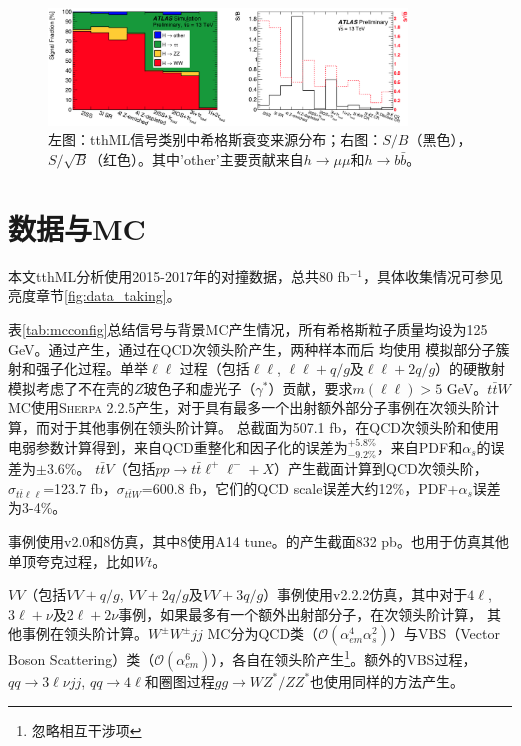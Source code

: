 \begin{figure}[h]
\centering
 \includegraphics[width=0.85\textwidth]{fig/tthML_signal_comp.png}
 \caption{左图：tthML信号类别中希格斯衰变来源分布；右图：$S/B$（黑色），$S/\sqrt{B}$（红色）。其中'other'主要贡献来自$h\rightarrow \mu\mu$和$h\rightarrow b\bar{b}$。\cite{Aaboud:2017jvq}}
 \label{fig:tthML_signal_comp}
\end{figure}

\section{数据与MC}
本文tthML分析使用2015-2017年的对撞数据，总共80 fb$^{-1}$，具体收集情况可参见亮度章节\ref{fig:data_taking}。

表\ref{tab:mcconfig}总结信号与背景MC产生情况，所有希格斯粒子质量均设为125 GeV。\tth 通过\POWHEGBOX 产生，\ttz 通过\MGMCatNLO 在QCD次领头阶产生，两种样本而后
均使用 模拟部分子簇射和强子化过程。单举\ttbar$\ell\ell$ 过程（包括\ttbar$\ell\ell$, \ttbar$\ell\ell+q/g$及\ttbar$\ell\ell+2q/g$）的硬散射模拟考虑了不在壳的$Z$玻色子和虚光子（$\gamma^*$）贡献，要求$m(\ell\ell)>5$ GeV。$t\bar{t}W$ MC使用\textsc{Sherpa 2.2.5}产生，对于具有最多一个出射额外部分子事例在次领头阶计算，而对于其他事例在领头阶计算。
\tth 总截面为507.1 fb，在QCD次领头阶和使用电弱参数\cite{Beenakker:2001rj,Beenakker:2002nc,Dawson:2002tg,Dawson:2003zu,Yu:2014cka,Frixione:2014qaa,Frixione:2015zaa}计算得到\cite{Heinemeyer:2013tqa,XSWG13TeV}，来自QCD重整化和因子化的误差为$^{+5.8\%}_{-9.2\%}$，来自PDF和$\alpha_s$的误差为$\pm3.6$\%。
$t\bar{t}V$（包括$pp\rightarrow t\bar{t}\ell^+\ell^-+X$）产生截面计算到QCD次领头阶\cite{Alwall:2014hca,Frixione:2015zaa}，$\sigma_{t\bar{t}\ell\ell}$=123.7 fb，$\sigma_{t\bar{t}W}$=600.8 fb，它们的QCD scale误差大约12\%，PDF+$\alpha_s$误差为3-4\%。

\ttbar 事例使用\POWHEG v2.0和\PYTHIA 8仿真，其中\PYTHIA 8使用A14 tune。\ttbar 的产生截面832 pb。\POWHEG 也用于仿真其他单顶夸克过程，比如$Wt$。

$VV$（包括$VV+q/g$, $VV+2q/g$及$VV+3q/g$）事例使用\SHERPA v2.2.2仿真，其中对于$4\ell$, $3\ell+\nu$及$2\ell+2\nu$事例，如果最多有一个额外出射部分子，在次领头阶计算，
其他事例在领头阶计算。$W^{\pm}W^{\pm}jj$ MC分为QCD类（$\mathcal{O}(\alpha_{em}^4\alpha_s^2)$）与VBS（Vector Boson Scattering）类（$\mathcal{O}(\alpha_{em}^6)$），各自在领头阶产生\footnote{忽略相互干涉项}。额外的VBS过程，$qq\rightarrow3\ell\nu jj$, $qq\rightarrow 4\ell$和圈图过程$gg\rightarrow WZ^*/ZZ^*$也使用同样的方法产生。


